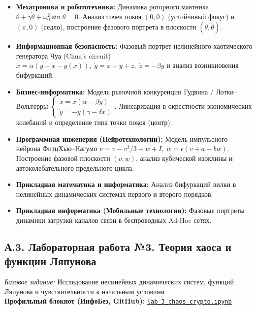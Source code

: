 \documentclass[12pt]{article}
\begin{document}
\begin{itemize}[nosep]
    \item \textbf{Мехатроника и робототехника:} Динамика роторного маятника $\ddot{\theta} + \gamma\dot{\theta} + \omega_0^2\sin\theta = 0$. Анализ точек покоя $(0, 0)$ (устойчивый фокус) и $(\pi, 0)$ (седло), построение фазового портрета в плоскости $(\theta, \dot{\theta})$.
    \item \textbf{Информационная безопасность:} Фазовый портрет нелинейного хаотического генератора Чуа (Chua's circuit) $\dot{x} = \alpha(y - x - g(x)), \; \dot{y} = x - y + z, \; \dot{z} = -\beta y$ и анализ возникновения бифуркаций.
    \item \textbf{Бизнес-информатика:} Модель рыночной конкуренции Гудвина / Лотки--Вольтерры $\begin{cases} \dot{x} = x(\alpha - \beta y) \\ \dot{y} = -y(\gamma - \delta x) \end{cases}$. Линеаризация в окрестности экономических колебаний и определение типа точки покоя (центр).
    \item \textbf{Программная инженерия (Нейротехнологии):} Модель импульсного нейрона ФитцХью--Нагумо $\dot{v} = v - v^3/3 - w + I, \; \dot{w} = \epsilon(v + a - bw)$. Построение фазовой плоскости $(v, w)$, анализ кубической изоклины и автоколебательного предельного цикла.
    \item \textbf{Прикладная математика и информатика:} Анализ бифуркаций вилки в нелинейных динамических системах первого и второго порядков.
    \item \textbf{Прикладная информатика (Мобильные технологии):} Фазовые портреты динамики загрузки каналов связи в беспроводных Ad-Hoc сетях.
\end{itemize}

\subsection*{А.3. Лабораторная работа №3. Теория хаоса и функции Ляпунова}\label{app:A3}
\textit{Базовое задание:} Исследование нелинейных динамических систем, функций Ляпунова и чувствительности к начальным условиям.\\[0.2em]
\textbf{Профильный блокнот (ИнфоБез, GitHub):} \href{https://github.com/SikioN/dif-eq/blob/main/lab/lab_3_chaos_crypto.ipynb}{\texttt{lab\_3\_chaos\_crypto.ipynb}}
\end{document}
